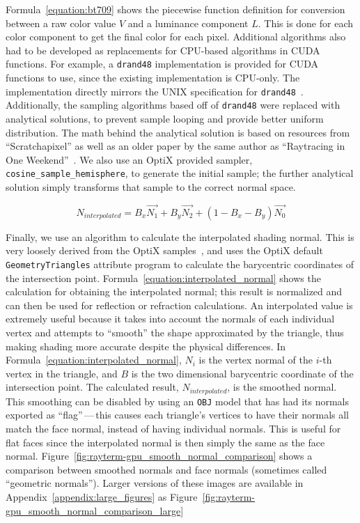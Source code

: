 Formula~\ref{equation:bt709} shows the piecewise function definition for conversion between a raw color value $V$ and a luminance component $L$.
This is done for each color component to get the final color for each pixel.
Additional algorithms also had to be developed as replacements for CPU-based algorithms in CUDA functions.
For example, a \texttt{drand48} implementation is provided for CUDA functions to use, since the existing implementation is CPU-only.
The implementation directly mirrors the UNIX specification for \texttt{drand48}~\cite{drand48UNIX}.
Additionally, the sampling algorithms based off of \texttt{drand48} were replaced with analytical solutions, to prevent sample looping and provide better uniform distribution.
The math behind the analytical solution is based on resources from ``Scratchapixel'' as well as an older paper by the same author as ``Raytracing in One Weekend''~\cite{prunier2017global, shirley1997map}.
We also use an OptiX provided sampler, \texttt{cosine\_sample\_hemisphere}, to generate the initial sample; the further analytical solution simply transforms that sample to the correct normal space.

\begin{equation}
\label{equation:interpolated_normal}
  N_{interpolated} = B_{x} \vec{N_{1}} + B_{y} \vec{N_{2}} + (1 - B_{x} - B_{y}) \vec{N_{0}}
\end{equation}

Finally, we use an algorithm to calculate the interpolated shading normal.
This is very loosely derived from the OptiX samples~\cite{optixsamples}, and uses the OptiX default \texttt{GeometryTriangles} attribute program to calculate the barycentric coordinates of the intersection point.
Formula~\ref{equation:interpolated_normal} shows the calculation for obtaining the interpolated normal; this result is normalized and can then be used for reflection or refraction calculations.
An interpolated value is extremely useful because it takes into account the normals of each individual vertex and attempts to ``smooth'' the shape approximated by the triangle, thus making shading more accurate despite the physical differences.
In Formula~\ref{equation:interpolated_normal}, $N_{i}$ is the vertex normal of the $i$-th vertex in the triangle, and $B$ is the two dimensional barycentric coordinate of the intersection point.
The calculated result, $N_{interpolated}$, is the smoothed normal.
This smoothing can be disabled by using an \texttt{OBJ} model that has had its normals exported as ``flag''\,---\,this causes each triangle's vertices to have their normals all match the face normal, instead of having individual normals.
This is useful for flat faces since the interpolated normal is then simply the same as the face normal.
Figure~\ref{fig:rayterm-gpu_smooth_normal_comparison} shows a comparison between smoothed normals and face normals (sometimes called ``geometric normals'').
Larger versions of these images are available in Appendix~\ref{appendix:large_figures} as Figure~\ref{fig:rayterm-gpu_smooth_normal_comparison_large}

